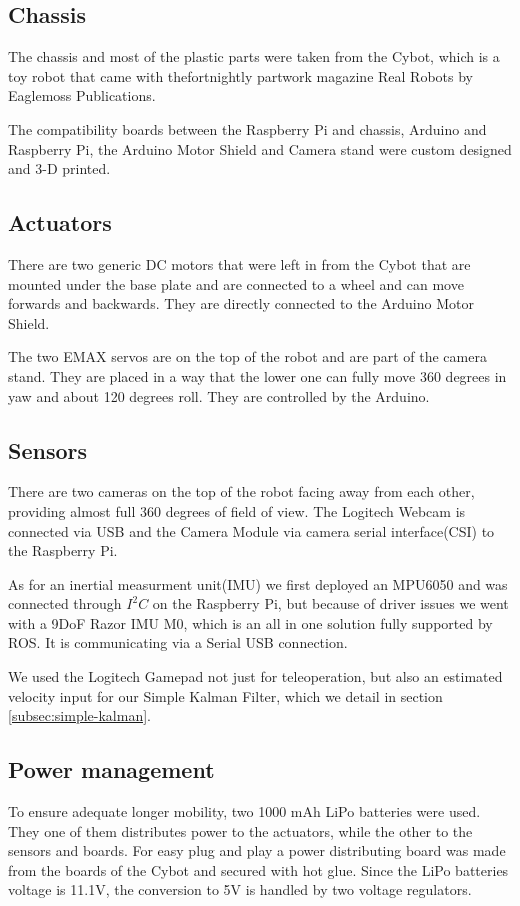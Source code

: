 \documentclass[class=article, crop=false]{standalone}
\begin{document}
\subsection{Chassis}\label{subsec:chassis}
The chassis and most of the plastic parts were taken from the Cybot, which is a toy robot that came with thefortnightly partwork magazine Real Robots by Eaglemoss Publications\footnotemark.


The compatibility boards between the Raspberry Pi and chassis, Arduino and Raspberry Pi, the Arduino Motor Shield and Camera stand were custom designed and 3-D printed.

\subsection{Actuators}\label{subsec:actuators}
There are two generic DC motors that were left in from the Cybot that are mounted under the base plate and are connected to a wheel and can move forwards and backwards. They are directly connected to the Arduino Motor Shield.

The two EMAX servos are on the top of the robot and are part of the camera stand. They are placed in a way that the lower one can fully move 360 degrees in yaw and about 120 degrees roll. They are controlled by the Arduino.

\subsection{Sensors}\label{subsec:sensors}
There are two cameras on the top of the robot facing away from each other, providing almost full 360 degrees of field of view. The Logitech Webcam is connected via USB and the Camera Module via camera serial interface(CSI) to the Raspberry Pi.

As for an inertial measurment unit(IMU) we first deployed an MPU6050 and was connected through $ I^2C $ on the Raspberry Pi, but because of driver issues we went with a 9DoF Razor IMU M0, which is an all in one solution fully supported by ROS. It is communicating via a Serial USB connection.

We used the Logitech Gamepad not just for teleoperation, but also an estimated velocity input for our Simple Kalman Filter, which we detail in section \ref{subsec:simple-kalman}.

\subsection{Power management}\label{subsec:power}
To ensure adequate longer mobility, two 1000 mAh LiPo batteries were used. They one of them distributes power to the actuators, while the other to the sensors and boards. For easy plug and play a power distributing board was made from the boards of the Cybot and secured with hot glue. Since the LiPo batteries voltage is 11.1V, the conversion to 5V is handled by two voltage regulators.
\end{document}
